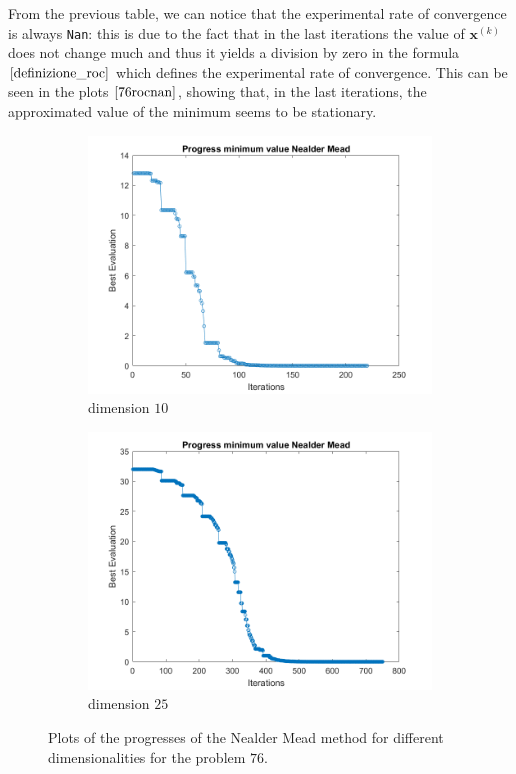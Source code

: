 From the previous table, we can notice that the experimental rate of convergence is always \verb+Nan+: this is due to the fact that in the last iterations the value of $\mathbf{x}^{(k)}$ does not change much and thus it yields a division by zero in the formula $\eqref{definizione_roc}$ which defines the experimental rate of convergence.
This can be seen in the plots $\eqref{76rocnan}$, showing that, in the last iterations, the approximated value of the minimum seems to be stationary.
\begin{figure}[htbp]
    \centering
    \begin{subfigure}[t]{0.35\textwidth}  %
        \centering
        \includegraphics[width=\textwidth]{img/pb76_SX_es10.png}
        \caption{dimension $10$}
    \end{subfigure}
    \hspace{1cm} %
    \begin{subfigure}[t]{0.35\textwidth}
        \centering
        \includegraphics[width=\textwidth]{img/pb76_SX_es25.png}
        \caption{dimension $25$}
    \end{subfigure}
    \caption{ \small Plots of the progresses of the Nealder Mead method for different dimensionalities for the problem $76$.}
    \label{76rocnan}
\end{figure}


